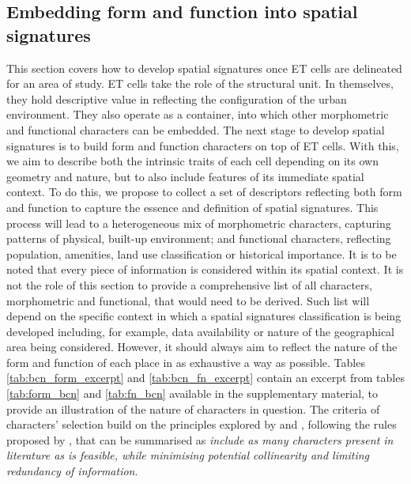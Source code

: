 \subsection{Embedding form and function into spatial signatures}
\label{ssec:ss_ff}

%
This section covers how to develop spatial signatures once ET cells are
delineated for an area of study.
ET cells take the role of the structural unit.
In themselves, they hold descriptive value in reflecting the configuration of
the urban environment. They also operate as a container, into which other
morphometric and functional characters can be embedded.
The next stage to develop spatial signatures is to build form and function
characters on top of ET cells. With this, we aim to describe both the
intrinsic traits of each cell depending on its own
geometry and nature, but to also include features of its immediate spatial
context.
To do this, we propose to collect a set of descriptors reflecting both form
and function to capture the essence and definition of spatial signatures.
%
This process will lead to a heterogeneous
mix of morphometric characters, capturing patterns of physical, built-up
environment; and functional characters, reflecting population, amenities,
land use classification or historical importance. It is to be noted that
every piece of information is considered within its spatial context.
It is not the role of this
section to provide a comprehensive list of all characters, morphometric and
functional, that would need to be derived. Such list will depend on the
specific context in which a spatial signatures classification is being
developed including, for example, data availability or nature of the
geographical area being considered.
%
However, it should always aim to reflect the nature of the form and function
of each place in as exhaustive a way as possible. Tables \ref{tab:bcn_form_excerpt} and \ref{tab:bcn_fn_excerpt}
contain an excerpt from tables \ref{tab:form_bcn} and \ref{tab:fn_bcn} available in
the supplementary material, to provide an illustration of the nature of characters in
question. The criteria of characters' selection build on the principles explored by
\cite{dibble2019origin} and \cite{fleischmann2021methodological}, following the rules
proposed by \cite{sneath1973numerical}, that can be summarised as
\emph{include as many characters present in literature as is feasible, while minimising potential collinearity
and limiting redundancy of information}.

